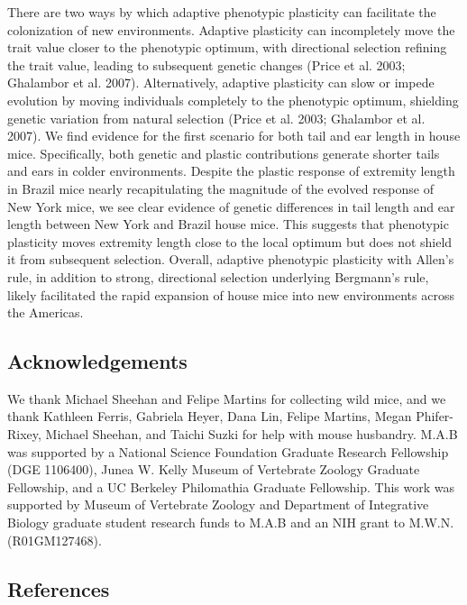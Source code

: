 \documentclass[]{article}
\begin{document}
There are two ways by which adaptive phenotypic plasticity can
facilitate the colonization of new environments. Adaptive plasticity can
incompletely move the trait value closer to the phenotypic optimum, with
directional selection refining the trait value, leading to subsequent
genetic changes (Price et al. 2003; Ghalambor et al. 2007).
Alternatively, adaptive plasticity can slow or impede evolution by
moving individuals completely to the phenotypic optimum, shielding
genetic variation from natural selection (Price et al. 2003; Ghalambor
et al. 2007). We find evidence for the first scenario for both tail and
ear length in house mice. Specifically, both genetic and plastic
contributions generate shorter tails and ears in colder environments.
Despite the plastic response of extremity length in Brazil mice nearly
recapitulating the magnitude of the evolved response of New York mice,
we see clear evidence of genetic differences in tail length and ear
length between New York and Brazil house mice. This suggests that
phenotypic plasticity moves extremity length close to the local optimum
but does not shield it from subsequent selection. Overall, adaptive
phenotypic plasticity with Allen's rule, in addition to strong,
directional selection underlying Bergmann's rule, likely facilitated the
rapid expansion of house mice into new environments across the Americas.

\vspace{5mm}

\hypertarget{acknowledgements}{%
\subsection{Acknowledgements}\label{acknowledgements}}

We thank Michael Sheehan and Felipe Martins for collecting wild mice,
and we thank Kathleen Ferris, Gabriela Heyer, Dana Lin, Felipe Martins,
Megan Phifer-Rixey, Michael Sheehan, and Taichi Suzki for help with
mouse husbandry. M.A.B was supported by a National Science Foundation
Graduate Research Fellowship (DGE 1106400), Junea W. Kelly Museum of
Vertebrate Zoology Graduate Fellowship, and a UC Berkeley Philomathia
Graduate Fellowship. This work was supported by Museum of Vertebrate
Zoology and Department of Integrative Biology graduate student research
funds to M.A.B and an NIH grant to M.W.N. (R01GM127468).

\vspace{10mm}

\hypertarget{references}{%
\subsection{References}\label{references}}
\end{document}
